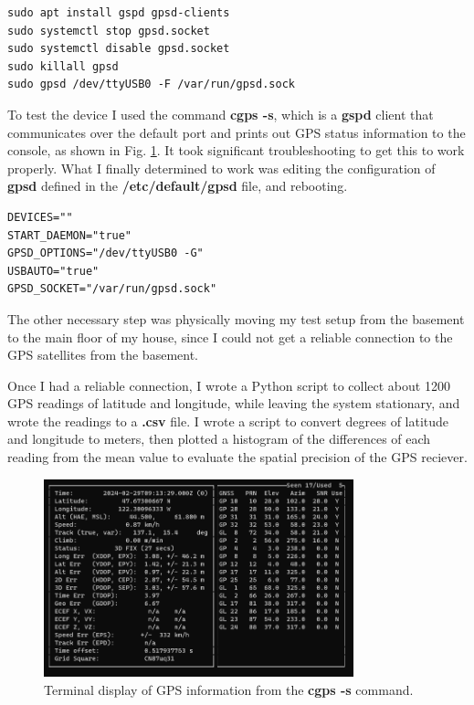 \documentclass[12pt]{article}
\begin{document}
\begin{lstlisting}
sudo apt install gspd gpsd-clients
sudo systemctl stop gpsd.socket
sudo systemctl disable gpsd.socket
sudo killall gpsd
sudo gpsd /dev/ttyUSB0 -F /var/run/gpsd.sock
\end{lstlisting}

To test the device I used the command \textbf{cgps -s}, which is a \textbf{gspd} client that communicates over the default port and prints out GPS status information to the console, as shown in Fig. \ref{fig:cgps}. It took significant troubleshooting to get this to work properly. What I finally determined to work was editing the configuration of \textbf{gpsd} defined in the \textbf{/etc/default/gpsd} file, and rebooting. 

\begin{lstlisting}
DEVICES=""
START_DAEMON="true"
GPSD_OPTIONS="/dev/ttyUSB0 -G"
USBAUTO="true"
GPSD_SOCKET="/var/run/gpsd.sock"
\end{lstlisting}

The other necessary step was physically moving my test setup from the basement to the main floor of my house, since I could not get a reliable connection to the GPS satellites from the basement.

Once I had a reliable connection, I wrote a Python script to collect about 1200 GPS readings of latitude and longitude, while leaving the system stationary, and wrote the readings to a \textbf{.csv} file. I wrote a script to convert degrees of latitude and longitude to meters, then plotted a histogram of the differences of each reading from the mean value to evaluate the spatial precision of the GPS reciever.

\begin{figure}[h]
\centering
\includegraphics[width=0.8\textwidth]{cgps.png} %
\caption{Terminal display of GPS information from the \textbf{cgps -s} command.}
\label{fig:cgps}
\end{figure}
\end{document}
